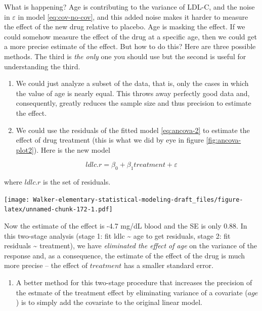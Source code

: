 \documentclass[]{book}
\providecommand{\tightlist}{%
  \setlength{\itemsep}{0pt}\setlength{\parskip}{0pt}}
\begin{document}
What is happening? Age is contributing to the variance of LDL-C, and the noise in \(\varepsilon\) in model \eqref{eq:cov-no-cov}, and this added noise makes it harder to measure the effect of the new drug relative to placebo. Age is masking the effect. If we could somehow measure the effect of the drug at a specific age, then we could get a more precise estimate of the effect. But how to do this? Here are three possible methods. The third is \emph{the only} one you should use but the second is useful for understanding the third.

\begin{enumerate}
\def\labelenumi{\arabic{enumi}.}
\item
  We could just analyze a subset of the data, that is, only the cases in which the value of age is nearly equal. This throws away perfectly good data and, consequently, greatly reduces the sample size and thus precision to estimate the effect.
\item
  We could use the residuals of the fitted model \eqref{eq:ancova-2} to estimate the effect of drug treatment (this is what we did by eye in figure \ref{fig:ancova-plot2}). Here is the new model
\end{enumerate}

\begin{equation}
ldlc.r = \beta_0 + \beta_1 treatment + \varepsilon
\label{eq:ancova-3}
\end{equation}

where \(ldlc.r\) is the set of residuals.

\texttt{[image: Walker-elementary-statistical-modeling-draft\_files/figure-latex/unnamed-chunk-172-1.pdf]}

Now the estimate of the effect is -4.7 mg/dL blood and the SE is only 0.88. In this two-stage analysis (stage 1: fit ldlc \textasciitilde{} age to get residuals, stage 2: fit residuals \textasciitilde{} treatment), we have \emph{eliminated the effect of age} on the variance of the response and, as a consequence, the estimate of the effect of the drug is much more precise -- the effect of \(treatment\) has a smaller standard error.

\begin{enumerate}
\def\labelenumi{\arabic{enumi}.}
\setcounter{enumi}{2}
\tightlist
\item
  A better method for this two-stage procedure that increases the precision of the estmate of the treatment effect by eliminating variance of a covariate (\(age\)) is to simply add the covariate to the original linear model.
\end{enumerate}
\end{document}
